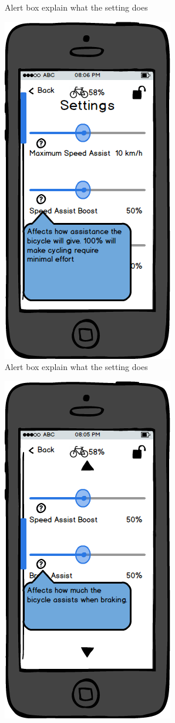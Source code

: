 \documentclass[a4paper]{report}
\begin{document}
{\begin{figure}
\caption{Alert box explain what the setting does}
\end{figure}
\clearpage
\begin{figure}
\centering
\includegraphics[scale=0.9]{figures/prototype_2/settings_help_2}
\caption{Alert box explain what the setting does}
\end{figure}
\clearpage
\begin{figure}
\centering
\includegraphics[scale=0.9]{figures/prototype_2/settings_help_3}

\end{figure}}
\end{document}
